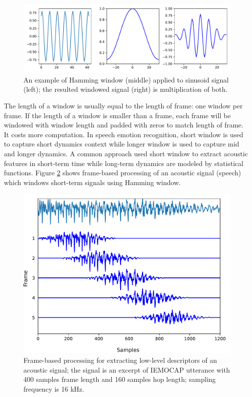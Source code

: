 \begin{figure}[htbp]
  \centering
  \includegraphics[width=\textwidth]{../fig/windowing_demo.pdf}
  \caption{An example of Hamming window (middle) applied to sinusoid signal (left); the resulted windowed signal (right) is multiplication of both.}
  \label{fig:windowing_demo}

\end{figure}
The length of a window is usually equal to the length of frame: one window per
frame. If the length of a window is smaller than a frame, each frame will be
windowed with window length and padded with zeros to match length of frame. It
costs more computation. In speech emotion recognition, short window is used to
capture short dynamics context while longer window is used to capture mid and
longer dynamics. A common approach used short window to extract acoustic
features in short-term time while long-term dynamics are modeled by statistical 
functions. Figure \ref{fig:frame-processing} shows frame-based processing of an
acoustic signal (speech) which windows short-term signals using Hamming window.

\begin{figure}[htbp]
  \centering
  \includegraphics[width=\textwidth]{../fig/framing.pdf}  
  \caption{Frame-based processing for extracting low-level descriptors of an acoustic signal; the signal is an excerpt of IEMOCAP utterance with 400 samples frame length and 160 samples hop length; sampling frequency is 16 kHz.}
  \label{fig:frame-processing}
\end{figure}

